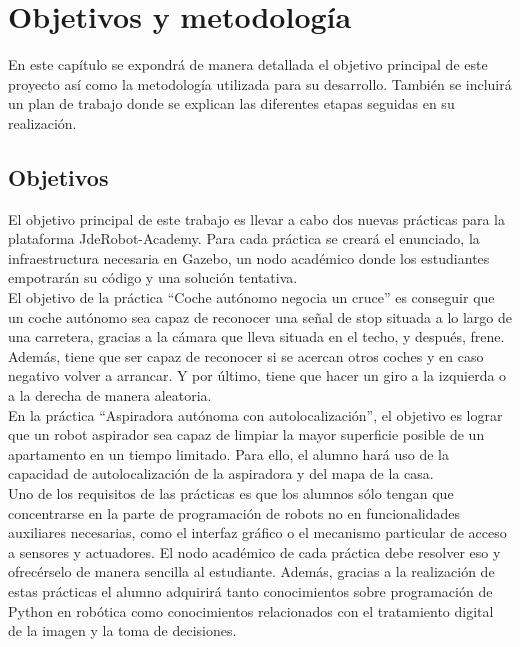 \chapter{Objetivos y metodología}\label{cap.objetivos}
En este capítulo se expondrá de manera detallada el objetivo principal de este proyecto así como la metodología utilizada para su desarrollo. También se incluirá un plan de trabajo donde se explican las diferentes etapas seguidas en su realización.

\section{Objetivos}

El objetivo principal de este trabajo es llevar a cabo dos nuevas prácticas para la plataforma JdeRobot-Academy. Para cada práctica se creará el enunciado, la infraestructura necesaria en Gazebo, un nodo académico donde los estudiantes empotrarán su código y una solución tentativa.  \\

El objetivo de la práctica ``Coche autónomo negocia un cruce'' es conseguir que un coche autónomo sea capaz de reconocer una señal de stop situada a lo largo de una carretera, gracias a la cámara que lleva situada en el techo, y después, frene. Además, tiene que ser capaz de reconocer si se acercan otros coches y en caso negativo volver a arrancar. Y por último, tiene que hacer un giro a la izquierda o a la derecha de manera aleatoria. \\

En la práctica ``Aspiradora autónoma con autolocalización'', el objetivo es lograr que un robot aspirador sea capaz de limpiar la mayor superficie posible de un apartamento en un tiempo limitado. Para ello, el alumno hará uso de la capacidad de autolocalización de la aspiradora y del mapa de la casa.\\

Uno de los requisitos de las prácticas es que los alumnos sólo tengan que concentrarse en la parte de programación de robots no en funcionalidades auxiliares necesarias, como el interfaz gráfico o el mecanismo particular de acceso a sensores y actuadores. El nodo académico de cada práctica debe resolver eso y ofrecérselo de manera sencilla al estudiante. Además, gracias a la realización de estas prácticas el alumno adquirirá tanto conocimientos sobre programación de Python en robótica como conocimientos relacionados con el tratamiento digital de la imagen y la toma de decisiones.


